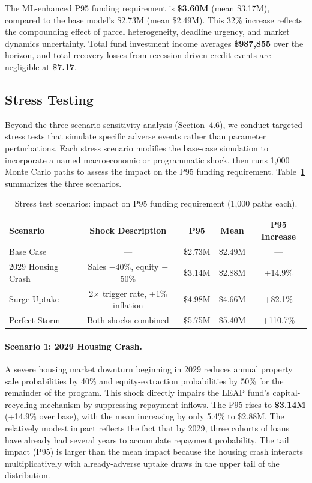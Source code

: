 \documentclass[11pt, letterpaper]{article}
\begin{document}
The ML-enhanced P95 funding requirement is \textbf{\$3.60M} (mean \$3.17M), compared to the base model's \$2.73M (mean \$2.49M). This 32\% increase reflects the compounding effect of parcel heterogeneity, deadline urgency, and market dynamics uncertainty. Total fund investment income averages \textbf{\$987{,}855} over the horizon, and total recovery losses from recession-driven credit events are negligible at \textbf{\$7.17}.

\subsection{Stress Testing}

Beyond the three-scenario sensitivity analysis (Section~4.6), we conduct targeted stress tests that simulate specific adverse events rather than parameter perturbations. Each stress scenario modifies the base-case simulation to incorporate a named macroeconomic or programmatic shock, then runs 1{,}000 Monte Carlo paths to assess the impact on the P95 funding requirement. Table~\ref{tab:stress} summarizes the three scenarios.

\begin{table}[H]
  \centering
  \caption{Stress test scenarios: impact on P95 funding requirement (1{,}000 paths each).}
  \label{tab:stress}
  \begin{tabular}{@{}lcccc@{}}
    \toprule
    \textbf{Scenario} & \textbf{Shock Description} & \textbf{P95} & \textbf{Mean} & \textbf{P95 Increase} \\
    \midrule
    Base Case & --- & \$2.73M & \$2.49M & --- \\
    2029 Housing Crash & Sales $-$40\%, equity $-$50\% & \$3.14M & \$2.88M & +14.9\% \\
    Surge Uptake & 2$\times$ trigger rate, +1\% inflation & \$4.98M & \$4.66M & +82.1\% \\
    Perfect Storm & Both shocks combined & \$5.75M & \$5.40M & +110.7\% \\
    \bottomrule
  \end{tabular}
\end{table}

\paragraph{Scenario 1: 2029 Housing Crash.} A severe housing market downturn beginning in 2029 reduces annual property sale probabilities by 40\% and equity-extraction probabilities by 50\% for the remainder of the program. This shock directly impairs the LEAP fund's capital-recycling mechanism by suppressing repayment inflows. The P95 rises to \textbf{\$3.14M} (+14.9\% over base), with the mean increasing by only 5.4\% to \$2.88M. The relatively modest impact reflects the fact that by 2029, three cohorts of loans have already had several years to accumulate repayment probability. The tail impact (P95) is larger than the mean impact because the housing crash interacts multiplicatively with already-adverse uptake draws in the upper tail of the distribution.
\end{document}
